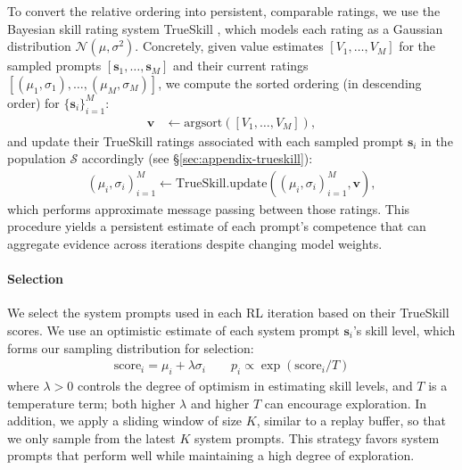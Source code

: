 \documentclass{article}
\theoremstyle{plain}
\theoremstyle{definition}
\theoremstyle{remark}
\begin{document}
To convert the relative ordering into persistent, comparable ratings, we use the Bayesian skill rating system {TrueSkill} \cite{trueskill}, which models each rating as a Gaussian distribution $\mathcal{N}(\mu, \sigma^{2})$. Concretely, given value estimates $[V_{1}, \dots, V_{M}]$ for the sampled prompts $[\mathbf{s}_{1}, \dots, \mathbf{s}_{M}]$ and their current ratings $[(\mu_{1}, \sigma_{1}), \dots, (\mu_{M}, \sigma_{M})]$, we compute the sorted ordering (in descending order) for $\{\mathbf{s}_{i}\}_{i=1}^{M}$:
\begin{align*}
\mathbf{v} &\leftarrow \mathrm{argsort}([V_{1},\dots, V_{M}]),
\end{align*}
and update their TrueSkill ratings associated with each sampled prompt $\mathbf{s}_{i}$ in the population $\mathcal{S}$ accordingly (see \S\ref{sec:appendix-trueskill}):
\begin{align*}
{(\mu_{i}, \sigma_{i})}_{i=1}^{M} \leftarrow \mathrm{TrueSkill.update}({(\mu_{i}, \sigma_{i})}_{i=1}^{M}, \mathbf{v}),
\end{align*}
which performs approximate message passing between those ratings. This procedure yields a persistent estimate of each prompt’s competence that can aggregate evidence across iterations despite changing model weights.

\vspace{-5pt}
\paragraph{Selection} We select the system prompts used in each RL iteration based on their TrueSkill scores. We use an optimistic estimate of each system prompt $\mathbf{s}_{i}$'s skill level, which forms our sampling distribution for selection:
\begin{align}
\label{eq:selection-equation}
    \mathrm{score}_{i} = \mu_{i}+\lambda \sigma_{i} \qquad p_{i} \propto \exp ( \mathrm{score}_{i} /T )
\end{align}
where $\lambda>0$ controls the degree of optimism in estimating skill levels, and $T$ is a temperature term; both higher $\lambda$ and higher $T$ can encourage exploration. In addition, we apply a sliding window of size $K$, similar to a replay buffer, so that we only sample from the latest $K$ system prompts. This strategy favors system prompts that perform well while maintaining a high degree of exploration.
\end{document}
